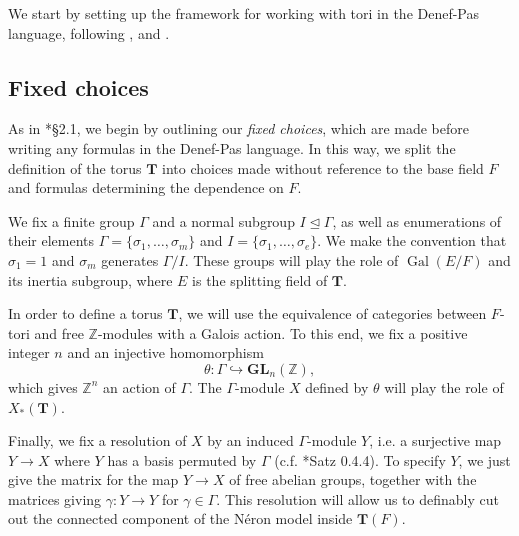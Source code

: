 \documentclass{amsart}
\newcommand{\Z}{{\mathbb Z}}
\newcommand{\GL}{\mathbf {GL}}
\newcommand{\bT}{\mathbf {T}}
\newcommand\spl{\mathrm{spl}}
\DeclareMathOperator{\Gal}{Gal}
\theoremstyle{plain}
\theoremstyle{definition}
\begin{document}
We start by setting up the framework for working with tori in the Denef-Pas language, following \cite{cluckers-hales-loeser}, \cite{CGH-2} and \cite{hales:transfert}.



\subsection{Fixed choices}\label{sub:fixedchoices}

As in \cite{hales:transfert}*{\S 2.1}, we begin by outlining our \emph{fixed choices}, which are made before writing any formulas in the Denef-Pas language.  
In this way, we split the definition of the torus $\bT$ into choices made without reference to the base field $F$ and formulas determining the dependence on $F$.

We fix a finite group $\Gamma$ and a normal subgroup $I \unlhd \Gamma$, as well as enumerations of their elements $\Gamma = \{\sigma_1, \dots, \sigma_m\}$ and $I = \{\sigma_1, \dots, \sigma_e\}$.  We make the convention that $\sigma_1 = 1$ and $\sigma_m$ generates $\Gamma / I$.  These groups will play the role of $\Gal(E/F)$ and its inertia subgroup, where $E$ is the splitting field of $\bT$.

In order to define a torus $\bT$, we will use the equivalence of categories between $F$-tori and free $\Z$-modules with a Galois action.  To this end, we fix a positive integer $n$ and an injective homomorphism
\begin{equation} \label{eq:theta}
\theta : \Gamma \hookrightarrow \GL_n(\Z),
\end{equation}
which gives $\Z^n$ an action of $\Gamma$.  The $\Gamma$-module $X$ defined by $\theta$ will play the role of $X_\ast(\bT)$.

Finally, we fix a resolution of $X$ by an induced $\Gamma$-module $Y$, i.e. a surjective map $Y \to X$ where $Y$ has a basis permuted by $\Gamma$ (c.f. \cite{brahm}*{Satz 0.4.4}).  To specify $Y$, we just give the matrix for the map $Y \to X$ of free abelian groups, together with the matrices giving $\gamma : Y \to Y$ for $\gamma \in \Gamma$. This resolution will allow us to definably cut out the connected component of the N\'eron model inside $\bT(F)$.

\end{document}
